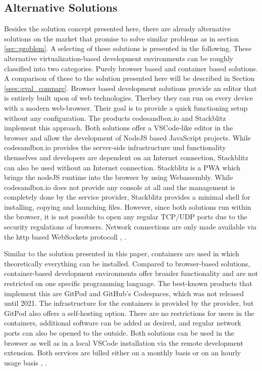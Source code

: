 \subsection{Alternative Solutions}\label{ssec::alternatives}
Besides the solution concept presented here, there are already alternative solutions on the market that promise to solve similar problems as in section \ref{sec::problem}. A selecting of these solutions is presented in the following. These alternative virtualization-based development environments can be roughly classified into two categories. Purely browser based and container based solutions. A comparison of these to the solution presented here will be described in Section \ref{sses::eval_compare}.
Browser based development solutions provide an editor that is entirely built upon of web technologies. Therbey they can run on every device with a modern web-browser. Their goal is to provide a quick functioning setup without any configuration.\newline
The products codesandbox.io and Stackblitz implement this approach. Both solutions offer a \ac{VSCode}-like editor in the browser and allow the development of NodeJS based JavaScript projects.
While codesandbox.io provides the server-side infrastructure und functionality themselves and developers are dependent on an Internet connection, Stackblitz can also be used without an Internet connection. Stackblitz is a \ac{PWA} which brings the nodeJS runtime into the browser by using Webassembly. While codesandbox.io does not provide any console at all and the management is completely done by the service provider, Stackblitz provides a minimal shell for installing, copying and launching files. However, since both solutions run within the browser, it is not possible to open any regular TCP/UDP ports due to the security regulations of browsers. Network connections are only made available via the http based WebSockets protocoll \cite{codesandbox}, \cite{stackblitz}.

Similar to the solution presented in this paper, containers are used in which theoretically everything can be installed. Compared to browser-based solutions, container-based development environments offer broader functionality and are not restricted on one specific programming language. The best-known products that implement this are GitPod and GitHub's Codespaces, which was not released until 2021. The infrastructure for the containers is provided by the provider, but GitPod also offers a self-hosting option. There are no restrictions for users in the containers, additional software can be added as desired, and regular network ports can also be opened to the outside. Both solutions can be used in the browser as well as in a local \ac{VSCode} installation via the remote development extension.\newline
Both services are billed either on a monthly basis or on an hourly usage basis \cite{githubcodespace}, \cite{gitpod}.
